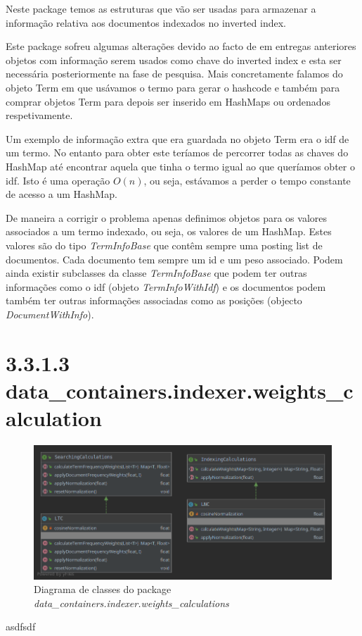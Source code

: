 \documentclass[12pt]{article}
\begin{document}
Neste package temos as estruturas que vão ser usadas para armazenar a
informação relativa aos documentos indexados no inverted index.

Este package sofreu algumas alterações devido ao facto de em entregas
anteriores objetos com informação serem usados como chave do inverted
index e esta ser necessária posteriormente na fase de pesquisa. Mais
concretamente falamos do objeto Term em que usávamos o termo para
gerar o hashcode e também para comprar objetos Term para depois ser
inserido em HashMaps ou ordenados respetivamente.

Um exemplo de informação extra que era guardada no objeto Term era o
idf de um termo. No entanto para obter este teríamos de percorrer
todas as chaves do HashMap até encontrar aquela que tinha o termo
igual ao que queríamos obter o idf. Isto é uma operação $O(n)$, ou
seja, estávamos a perder o tempo constante de acesso a um HashMap.

De maneira a corrigir o problema apenas definimos objetos para os
valores associados a um termo indexado, ou seja, os valores de um
HashMap. Estes valores são do tipo {\it TermInfoBase} que contêm
sempre uma posting list de documentos. Cada documento tem sempre um
id e um peso associado. Podem ainda existir subclasses da classe {\it
TermInfoBase} que podem ter outras informações como o idf (objeto
{\it TermInfoWithIdf}) e os documentos podem também ter outras
informações associadas como as posições (objecto {\it
DocumentWithInfo}).

\section*{3.3.1.3 data\_containers.indexer.weights\_calculation}
\begin{figure}[H]
  \center
   \includegraphics[width=\linewidth]{packages_data_containers_indexer_weights_calculation.png}
  \caption{Diagrama de classes do package \it
    data\_containers.indexer.weights\_calculations}
\end{figure}
asdfsdf
\end{document}
